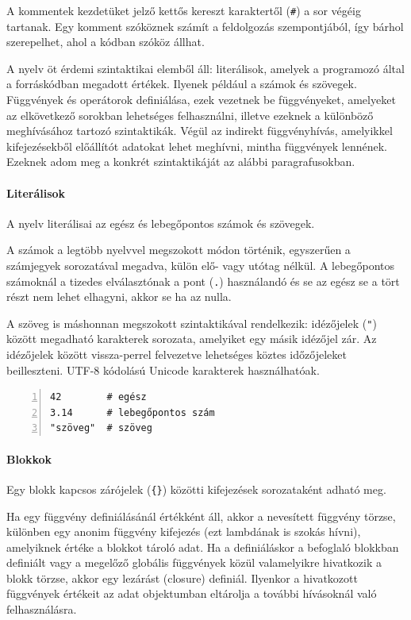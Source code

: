 A kommentek kezdetüket jelző kettős kereszt karaktertől ({\tt \#}) a sor végéig tartanak.
Egy komment szóköznek számít a feldolgozás szempontjából, így bárhol szerepelhet, ahol a kódban szóköz állhat.

A nyelv öt érdemi szintaktikai elemből áll: literálisok, amelyek a programozó által a forráskódban megadott értékek. Ilyenek például a számok és szövegek.
Függvények és operátorok definiálása, ezek vezetnek be függvényeket, amelyeket az elkövetkező sorokban lehetséges felhasználni, illetve ezeknek a különböző meghívásához tartozó szintaktikák.
Végül az indirekt függvényhívás, amelyikkel kifejezésekből előállítót adatokat lehet meghívni, mintha függvények lennének.
Ezeknek adom meg a konkrét szintaktikáját az alábbi paragrafusokban.

\paragraph{Literálisok} A nyelv literálisai az egész és lebegőpontos számok és szövegek.

A számok a legtöbb nyelvvel megszokott módon történik, egyszerűen a számjegyek sorozatával megadva, külön elő- vagy utótag nélkül.
A lebegőpontos számoknál a tizedes elválasztónak a pont ({\tt .}) használandó és se az egész se a tört részt nem lehet elhagyni, akkor se ha az nulla.

A szöveg is máshonnan megszokott szintaktikával rendelkezik: idézőjelek ({\tt "}) között megadható karakterek sorozata, amelyiket egy másik idézőjel zár.
Az idézőjelek között vissza-perrel felvezetve lehetséges köztes időzőjeleket beilleszteni.
UTF-8 kódolású Unicode karakterek használhatóak.

\begin{lstlisting}[numbers=left]
42        # egész
3.14      # lebegőpontos szám
"szöveg"  # szöveg
\end{lstlisting}

\paragraph{Blokkok} Egy blokk kapcsos zárójelek ({\tt \{\}}) közötti kifejezések sorozataként adható meg.

Ha egy függvény definiálásánál értékként áll, akkor a nevesített függvény törzse, különben egy anonim függvény kifejezés (ezt lambdának is szokás hívni), amelyiknek értéke a blokkot tároló adat.
Ha a definiáláskor a befoglaló blokkban definiált vagy a megelőző globális függvények közül valamelyikre hivatkozik a blokk törzse, akkor egy lezárást (closure) definiál.
Ilyenkor a hivatkozott függvények értékeit az adat objektumban eltárolja a további hívásoknál való felhasználásra.

